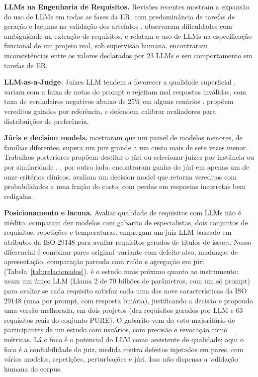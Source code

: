 \documentclass[12pt]{article}
\begin{document}
\textbf{LLMs na Engenharia de Requisitos.} Revisões recentes mostram a expansão do uso de LLMs em todas as fases da ER, com predominância de tarefas de geração e lacunas na validação dos artefatos \citep{marques2024,silva2025}. \citet{almeida2025} observaram dificuldades com ambiguidade na extração de requisitos, e \citet{pasquale2025} relatam o uso de LLMs na especificação funcional de um projeto real, sob supervisão humana. \citet{yamani2025} encontraram inconsistências entre os valores declarados por 23 LLMs e seu comportamento em tarefas de ER.

\textbf{LLM-as-a-Judge.} Juízes LLM tendem a favorecer a qualidade superficial \citep{zhou2024}, variam com a faixa de notas do prompt \citep{fujinuma2025} e rejeitam mal respostas inválidas, com taxa de verdadeiros negativos abaixo de 25\% em alguns cenários \citep{jain2025}. \citet{badshah2024} propõem vereditos guiados por referência, e \citet{li2025confidence} defendem calibrar avaliadores para distribuições de preferência.

\textbf{Júris e decision models.} \citet{verga2024} mostraram que um painel de modelos menores, de famílias diferentes, supera um juiz grande a um custo mais de sete vezes menor. Trabalhos posteriores propõem destilar o júri \citep{tang2025} ou selecionar juízes por instância \citep{li2025jury} ou por similaridade \citep{yang2025}. \citet{williams2025}, por outro lado, encontraram ganho do júri em apenas um de onze critérios clínicos. \citet{li2026jev} avaliam um decision model que retorna vereditos com probabilidades a uma fração do custo, com perdas em respostas incorretas bem redigidas.

\textbf{Posicionamento e lacuna.} Avaliar qualidade de requisitos com LLMs não é inédito. \citet{shefa2026} comparam dez modelos com gabarito de especialistas, dois conjuntos de requisitos, repetições e temperaturas. \citet{paiva2026} empregam um juiz LLM baseado em atributos da ISO 29148 para avaliar requisitos gerados de títulos de issues. Nosso diferencial é combinar pares original--variante com defeito-alvo, mudanças de apresentação, comparação pareada com ruído e agregação em júri (Tabela~\ref{tab:relacionados}). \citet{lubos2024} é o estudo mais próximo quanto ao instrumento: usam um único LLM (Llama 2 de 70 bilhões de parâmetros, com um só prompt) para avaliar se cada requisito satisfaz cada uma das nove características da ISO 29148 (uma por prompt, com resposta binária), justificando a decisão e propondo uma versão melhorada, em dois projetos (dez requisitos gerados por LLM e 63 requisitos reais do conjunto PURE). O gabarito vem do voto majoritário de participantes de um estudo com usuários, com precisão e revocação como métricas. Lá o foco é o potencial do LLM como assistente de qualidade; aqui o foco é a confiabilidade do juiz, medida contra defeitos injetados em pares, com vários modelos, repetições, perturbações e júri. Isso não dispensa a validação humana do corpus.
\end{document}
